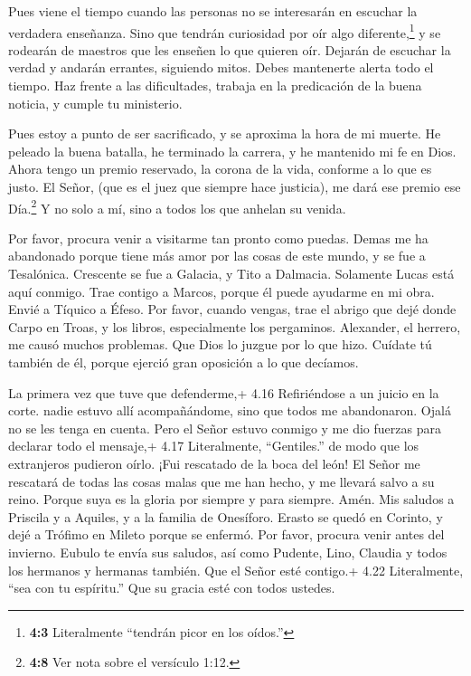  Pues viene el tiempo cuando las personas no se interesarán
en escuchar la verdadera enseñanza. Sino que tendrán curiosidad por oír
algo diferente,\footnote{\textbf{4:3} Literalmente ``tendrán picor en
  los oídos.''} y se rodearán de maestros que les enseñen lo que quieren
oír.  Dejarán de escuchar la verdad y andarán errantes,
siguiendo mitos.  Debes mantenerte alerta todo el tiempo.
Haz frente a las dificultades, trabaja en la predicación de la buena
noticia, y cumple tu ministerio.

 Pues estoy a punto de ser sacrificado, y se aproxima la
hora de mi muerte.  He peleado la buena batalla, he
terminado la carrera, y he mantenido mi fe en Dios.  Ahora
tengo un premio reservado, la corona de la vida, conforme a lo que es
justo. El Señor, (que es el juez que siempre hace justicia), me dará ese
premio ese Día.\footnote{\textbf{4:8} Ver nota sobre el versículo 1:12.}
Y no solo a mí, sino a todos los que anhelan su venida.

 Por favor, procura venir a visitarme tan pronto como
puedas.  Demas me ha abandonado porque tiene más amor por
las cosas de este mundo, y se fue a Tesalónica. Crescente se fue a
Galacia, y Tito a Dalmacia.  Solamente Lucas está aquí
conmigo. Trae contigo a Marcos, porque él puede ayudarme en mi obra.
 Envié a Tíquico a Éfeso.  Por favor, cuando
vengas, trae el abrigo que dejé donde Carpo en Troas, y los libros,
especialmente los pergaminos.  Alexander, el herrero, me
causó muchos problemas. Que Dios lo juzgue por lo que hizo.
 Cuídate tú también de él, porque ejerció gran oposición a
lo que decíamos.

 La primera vez que tuve que defenderme,+ 4.16 Refiriéndose
a un juicio en la corte. nadie estuvo allí acompañándome, sino que todos
me abandonaron. Ojalá no se les tenga en cuenta.  Pero el
Señor estuvo conmigo y me dio fuerzas para declarar todo el mensaje,+
4.17 Literalmente, ``Gentiles.'' de modo que los extranjeros pudieron
oírlo. ¡Fui rescatado de la boca del león!  El Señor me
rescatará de todas las cosas malas que me han hecho, y me llevará salvo
a su reino. Porque suya es la gloria por siempre y para siempre. Amén.
 Mis saludos a Priscila y a Aquiles, y a la familia de
Onesíforo.  Erasto se quedó en Corinto, y dejé a Trófimo en
Mileto porque se enfermó.  Por favor, procura venir antes
del invierno. Eubulo te envía sus saludos, así como Pudente, Lino,
Claudia y todos los hermanos y hermanas también.  Que el
Señor esté contigo.+ 4.22 Literalmente, ``sea con tu espíritu.'' Que su
gracia esté con todos ustedes.
